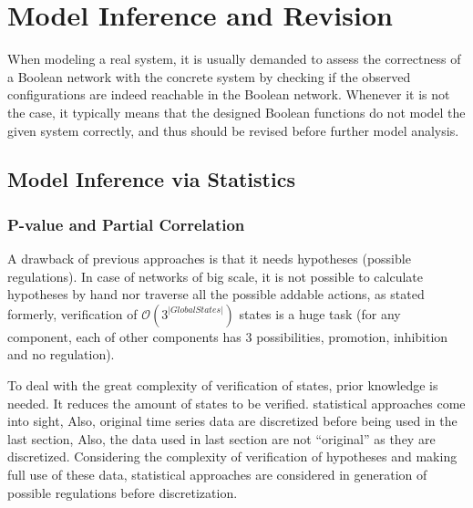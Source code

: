 \chapter{Model Inference and Revision}
When modeling a real system, it is usually demanded to assess the correctness of a Boolean network with the concrete system by checking if the observed configurations are indeed reachable in the Boolean network.
Whenever it is not the case, it typically means that the designed Boolean functions do not model the given system correctly, and thus should be revised before further model analysis.

\section{Model Inference via Statistics}

\subsection{P-value and Partial Correlation}
A drawback of previous approaches is that it needs hypotheses (possible regulations). In case of networks of big scale, it is not possible to calculate hypotheses by hand nor traverse all the possible addable actions, as stated formerly, verification of  $\mathcal{O}(3^{|Global States|})$ states is a huge task (for any component, each of other components has 3 possibilities, promotion, inhibition and no regulation).\par
To deal with the great complexity of verification of states, prior knowledge is needed. It reduces the amount of states to be verified.  statistical approaches come into sight,
Also, original time series data are discretized before being used in the last section, 
Also, the data used in last section are not ``original'' as they are discretized. Considering the complexity of verification of hypotheses and making full use of these data, statistical approaches are considered in generation of possible regulations before discretization.\par


